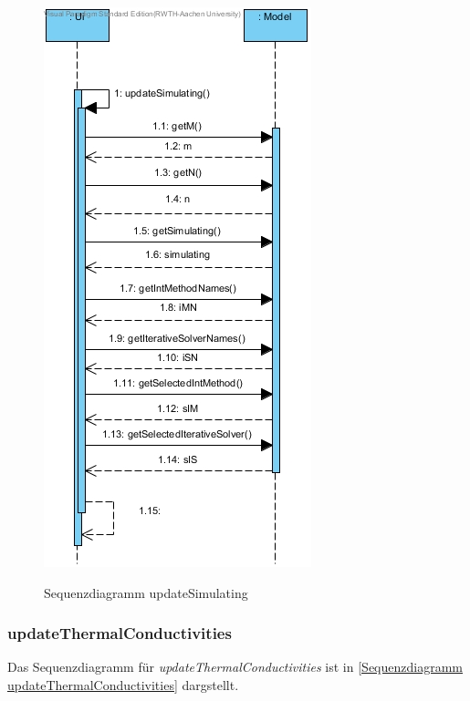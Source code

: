 \begin{figure}[H]
	\centering
	\includegraphics[scale=.6]{Bilder/Ui__updateSimulating().jpg}\\
	\caption{Sequenzdiagramm updateSimulating}
	\label{Sequenzdiagramm updateSimulating}
\end{figure}

\subsubsection*{updateThermalConductivities}

Das Sequenzdiagramm für \emph{updateThermalConductivities} ist in \ref{Sequenzdiagramm updateThermalConductivities} dargstellt.

